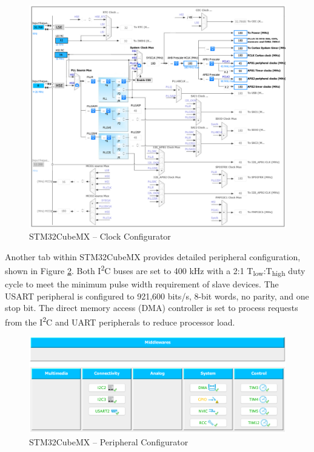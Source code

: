 \begin{figure}[H]   %
	\centering \includegraphics[width=6in, keepaspectratio]{figures/stm32cubemx_clocks.png}
	\caption{STM32CubeMX -- Clock Configurator}\label{fig:stm32cubemx_clocks}
\end{figure}

Another tab within STM32CubeMX provides detailed peripheral configuration, shown in Figure \ref{fig:stm32cubemx_config}. Both I\textsuperscript{2}C buses are set to 400 kHz with a 2:1 T\textsubscript{low}:T\textsubscript{high} duty cycle to meet the minimum pulse width requirement of slave devices. The USART peripheral is configured to 921,600 bits/s, 8-bit words, no parity, and one stop bit. The direct memory access (DMA) controller is set to process requests from the I\textsuperscript{2}C and UART peripherals to reduce processor load. 

\begin{figure}[H]   %
	\centering \includegraphics[width=6in, keepaspectratio]{figures/stm32cubemx_config.png}
	\caption{STM32CubeMX -- Peripheral Configurator}\label{fig:stm32cubemx_config}
\end{figure}

